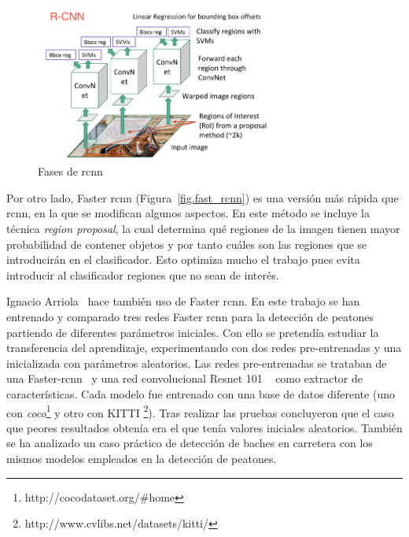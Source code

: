\begin{figure}[H]
  \begin{center}
    \includegraphics[width=0.7\textwidth]{figures/Estado_arte/rcnn.png}
		\caption{Fases de \acrshort{rcnn}}
		\label{fig.rcnn}
		\end{center}
\end{figure}

Por otro lado, Faster \acrshort{rcnn} (Figura~\ref{fig.fast_rcnn}) es una versión más rápida que \acrshort{rcnn}, en la que se modifican algunos aspectos. En este método se incluye la técnica \textit{region proposal}, la cual determina qué regiones de la imagen tienen mayor probabilidad de contener objetos y por tanto cuáles son las regiones que se introducirán en el clasificador. Esto optimiza mucho el trabajo pues evita introducir al clasificador regiones que no sean de interés.


Ignacio Arriola~\cite{tesis_ignacio_arriola} hace también uso de Faster \acrshort{rcnn}. En este trabajo se han entrenado y comparado tres redes Faster \acrshort{rcnn} para la detección de peatones partiendo de diferentes parámetros iniciales. Con ello se pretendía estudiar la transferencia del aprendizaje, experimentando con dos redes pre-entrenadas y una inicializada con parámetros aleatorios.  Las redes pre-entrenadas se trataban de una Faster-\acrshort{rcnn}~\cite{faster_rcnn_ignacio} y una red convolucional Resnet 101 ~\cite{faster_rcnn_regnet_ignacio} como extractor de características. Cada modelo fue entrenado con una base de datos diferente (uno con \textit{\acrfull{coco}}\footnote{http://cocodataset.org/\#home} y otro con KITTI \footnote{http://www.cvlibs.net/datasets/kitti/}). Tras realizar las pruebas concluyeron que el caso que peores resultados obtenía era el que tenía valores iniciales aleatorios. También se ha analizado un caso práctico de detección de baches en carretera con los mismos modelos empleados en la detección de peatones.

